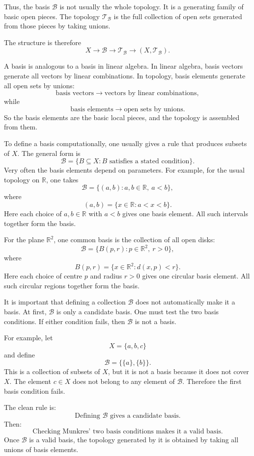 \documentclass{article}
\begin{document}
	Thus, the basis \(\mathcal B\) is not usually the whole topology. It is a generating family of basic open pieces. The topology \(\mathcal T_{\mathcal B}\) is the full collection of open sets generated from those pieces by taking unions.
	
	The structure is therefore
	$$
	X
	\longrightarrow
	\mathcal B
	\longrightarrow
	\mathcal T_{\mathcal B}
	\longrightarrow
	(X,\mathcal T_{\mathcal B}).
	$$
	
	A basis is analogous to a basis in linear algebra. In linear algebra, basis vectors generate all vectors by linear combinations. In topology, basis elements generate all open sets by unions:
	$$
	\text{basis vectors}
	\longrightarrow
	\text{vectors by linear combinations},
	$$
	while
	$$
	\text{basis elements}
	\longrightarrow
	\text{open sets by unions}.
	$$
	So the basis elements are the basic local pieces, and the topology is assembled from them.
	
	To define a basis computationally, one usually gives a rule that produces subsets of \(X\). The general form is
	$$
	\mathcal B=\{B\subseteq X:B\text{ satisfies a stated condition}\}.
	$$
	Very often the basis elements depend on parameters. For example, for the usual topology on \(\mathbb R\), one takes
	$$
	\mathcal B=\{(a,b):a,b\in\mathbb R,\ a<b\},
	$$
	where
	$$
	(a,b)=\{x\in\mathbb R:a<x<b\}.
	$$
	Here each choice of \(a,b\in\mathbb R\) with \(a<b\) gives one basis element. All such intervals together form the basis.
	
	For the plane \(\mathbb R^2\), one common basis is the collection of all open disks:
	$$
	\mathcal B=\{B(p,r):p\in\mathbb R^2,\ r>0\},
	$$
	where
	$$
	B(p,r)=\{x\in\mathbb R^2:d(x,p)<r\}.
	$$
	Here each choice of centre \(p\) and radius \(r>0\) gives one circular basis element. All such circular regions together form the basis.
	
	It is important that defining a collection \(\mathcal B\) does not automatically make it a basis. At first, \(\mathcal B\) is only a candidate basis. One must test the two basis conditions. If either condition fails, then \(\mathcal B\) is not a basis.
	
	For example, let
	$$
	X=\{a,b,c\}
	$$
	and define
	$$
	\mathcal B=\{\{a\},\{b\}\}.
	$$
	This is a collection of subsets of \(X\), but it is not a basis because it does not cover \(X\). The element \(c\in X\) does not belong to any element of \(\mathcal B\). Therefore the first basis condition fails.
	
	The clean rule is:
	$$
	\text{Defining }\mathcal B\text{ gives a candidate basis.}
	$$
	Then:
	$$
	\text{Checking Munkres' two basis conditions makes it a valid basis.}
	$$
	Once \(\mathcal B\) is a valid basis, the topology generated by it is obtained by taking all unions of basis elements.
	
\end{document}

